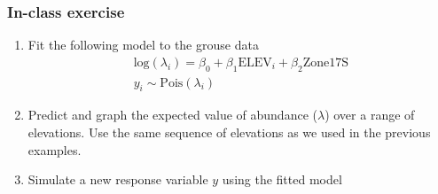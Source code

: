 \documentclass[color=usenames,dvipsnames]{beamer}\usepackage[]{graphicx}\usepackage[]{color}
\begin{document}
\begin{frame}
  \frametitle{In-class exercise}
  \begin{enumerate}
    \item Fit the following model to the grouse data
      \begin{gather*}
        \mathrm{log}(\lambda_i) = \beta_0 + \beta_1\mathrm{ELEV}_i + \beta_2\mathrm{Zone17S}\\
        y_i \sim \mathrm{Pois}(\lambda_i)
      \end{gather*}
    \item Predict and graph the expected value of abundance ($\lambda$)
      over a range of elevations. Use the same sequence of elevations as
      we used in the previous examples.
    \item Simulate a new response variable $y$ using the fitted model
  \end{enumerate}
\end{frame}



















\end{document}
